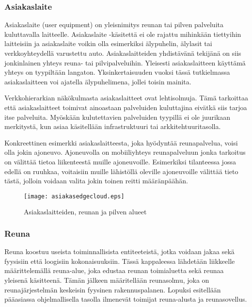 

\subsubsection{Asiakaslaite}
Asiakaslaite (user equipment) on yleisnimitys reunan tai pilven palveluita kuluttavalla laitteelle.
Asiakaslaite -käsitettä ei ole rajattu mihinkään tiettyihin laitteisiin ja asiakaslaite voikin olla esimerkiksi älypuhelin, älylasit tai verkkoyhteydellä varustettu auto. 
Asiakaslaitteiden yhdistävänä tekijänä on siis jonkinlainen yhteys reuna- tai pilvipalveluihin. Yleisesti asiakaslaitteen käyttämä yhteys on tyypiltään langaton. 
Yksinkertaisuuden vuoksi tässä tutkielmassa asiakaslaitteen voi ajatella älypuhelimena, jollei toisin mainita.

Verkkohierarkian näkökulmasta asiakaslaitteet ovat lehtisolmuja. Tämä tarkoittaa että asiakaslaitteet toimivat ainoastaan palveluiden kuluttajina eivätkä siis tarjoa itse palveluita. Myöskään kulutettavien palveluiden tyypillä ei ole juurikaan merkitystä, kun asiaa käsitellään infrastruktuuri tai arkkitehtuuritasolla.

Konkreettinen esimerkki asiakaslaitteesta, joka hyödyntää reunapalvelua, voisi olla jokin ajoneuvo.
Ajoneuvolla on mobiiliyhteys reunapalveluun jonka tarkoitus on välittää tietoa liikenteestä muille ajoneuvoille. Esimerkiksi tilanteessa jossa edellä on ruuhkaa, voitaisiin muille lähistöllä oleville ajoneuvoille välittää tieto tästä, jolloin voidaan valita jokin toinen reitti määränpäähän.

\begin{figure}[tb]
\texttt{[image: asiakasedgecloud.eps]}
\caption{Asiakaslaitteiden, reunan ja pilven alueet} \label{fig:asiakasedgecloud}
\end{figure}

\subsubsection{Reuna} \label{reunatoimijat}
Reuna koostuu useista toiminnallisista entiteeteistä, jotka voidaan jakaa sekä fyysisiin että loogisiin kokonaisuuksiin. 
Tässä kappaleessa lähdetään liikkeelle määrittelemällä reuna-alue, joka edustaa reunan toimialuetta sekä reunaa yleisenä käsitteenä.
Tämän jälkeen määritellään reunasolmu, joka on reunajärjestelmän keskeisin fyysinen rakennuspalanen.
Lopuksi esitellään pääasiassa ohjelmallisella tasolla ilmenevät toimijat reuna-alusta ja reunasovellus.


